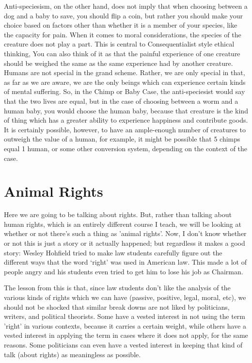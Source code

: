Anti-speciesism, on the other hand, does not imply that when choosing between a dog and a baby to save, you should flip a coin, but rather you should make your choice based on factors other than whether it is a member of your species, like the capacity for pain. When it comes to moral considerations, the species of the creature does not play a part. This is central to Consequentialist style ethical thinking, You can also think of it as that the painful experience of one creature should be weighed the same as the same experience had by another creature. Humans are not special in the grand scheme. Rather, we are only special in that, as far as we are aware, we are the only beings which can experience certain kinds of mental suffering. So, in the Chimp or Baby Case, the anti-speciesist would say that the two lives are equal, but in the case of choosing between a worm and a human baby, you would choose the human baby, because that creature is the kind of thing which has a greater ability to experience happiness and contribute goods.  It is certainly possible, however, to have an ample-enough number of creatures to outweigh the value of a human, for example, it might be possible that 5 chimps equal 1 human, or some other conversion system, depending on the context of the case. 

\section{Animal Rights}
Here we are going to be talking about rights. But, rather than talking about human rights, which is an entirely different course I teach, we will be looking at whether or not there's such a thing as 'animal rights'. Now, I don't know whether or not this is just a story or it actually happened; but regardless it makes a good story: Wesley Hohfield tried to make law students carefully figure out the different ways that the word ‘right’ was used in American law. This made a lot of people angry and his students even tried to get him to lose his job as Chairman. 

The lesson from this is that, since law students don’t like the analysis of the various kinds of rights which we can have (passive, positive, legal, moral, etc), we should not be shocked that similar break downs are not liked by politicians, writers, and political theorists. Some have a vested interest in not using the term 'right' in various contexts, because it carries a certain weight, while others have a vested interest in applying the term in cases where it does not apply, for the same reasons. Some politicians can even have a vested interest in keeping that kind of talk (about rights) as meaningless as possible.

